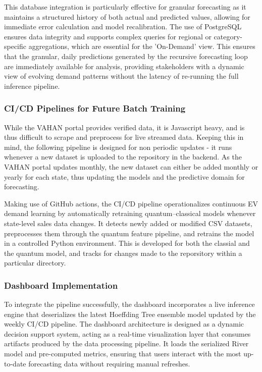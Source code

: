 \documentclass[pdflatex,sn-mathphys-num]{sn-jnl}%
\begin{document}
This database integration is particularly effective for granular forecasting as it maintains a structured history of both actual and predicted values, allowing for immediate error calculation and model recalibration. The use of PostgreSQL ensures data integrity and supports complex queries for regional or category-specific aggregations, which are essential for the 'On-Demand' view. This ensures that the granular, daily predictions generated by the recursive forecasting loop are immediately available for analysis, providing stakeholders with a dynamic view of evolving demand patterns without the latency of re-running the full inference pipeline.

\subsubsection{CI/CD Pipelines for Future Batch Training}

While the VAHAN portal provides verified data, it is Javascript heavy, and is thus difficult to scrape and preprocess for live streamed data. Keeping this in mind, the following pipeline is designed for non periodic updates - it runs whenever a new dataset is uploaded to the repository in the backend. As the VAHAN portal updates monthly, the new dataset can either be added monthly or yearly for each state, thus updating the models and the predictive domain for forecasting. 

Making use of GitHub actions, the CI/CD pipeline operationalizes continuous EV demand learning by automatically retraining quantum–classical models whenever state-level sales data changes. It detects newly added or modified CSV datasets, preprocesses them through the quantum feature pipeline, and retrains the model in a controlled Python environment. This is developed for both the classial and the quantum model, and tracks for changes made to the reporsitory within a particular directory.

\subsubsection{Dashboard Implementation}

To integrate the pipeline successfully, the dashboard incorporates a live inference engine that deserializes the latest Hoeffding Tree ensemble model updated by the weekly CI/CD pipeline. The dashboard architecture is designed as a dynamic decision support system, acting as a real-time visualization layer that consumes artifacts produced by the data processing pipeline. It loads the serialized River model and pre-computed metrics, ensuring that users interact with the most up-to-date forecasting data without requiring manual refreshes.
\end{document}
